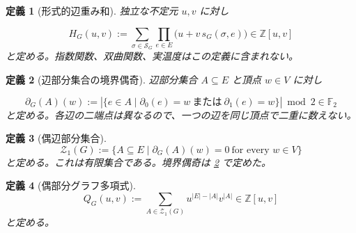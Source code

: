 \documentclass[11pt,a4paper]{article}
\newtheorem{definition}{定義}[section]
\theoremstyle{remark}
\begin{document}
\begin{definition}[形式的辺重み和]\label{lab:def_formal_edge_weight_sum}
独立な不定元 
$u,v$
 に対し

\[H_G(u,v):=\sum_{\sigma\in\mathcal S_G}\prod_{e\in E}\bigl(u+v\,s_G(\sigma,e)\bigr)\in\mathbb Z[u,v]\]
と定める。指数関数、双曲関数、実温度はこの定義に含まれない。

\end{definition}

\begin{definition}[辺部分集合の境界偶奇]\label{lab:def_mod_two_boundary_parity}
辺部分集合 
$A\subseteq E$
 と頂点 
$w\in V$
 に対し

\[\partial_G(A)(w):=\left|\{e\in A\mid \partial_0(e)=w\ \text{または}\ \partial_1(e)=w\}\right|\bmod 2\in\mathbb F_2\]
と定める。各辺の二端点は異なるので、一つの辺を同じ頂点で二重に数えない。

\end{definition}

\begin{definition}[偶辺部分集合]\label{lab:def_even_edge_subset}
\[\mathcal Z_1(G):=\{A\subseteq E\mid \partial_G(A)(w)=0\ \text{for every }w\in V\}\]
と定める。これは有限集合である。境界偶奇は 
\cref{lab:def_mod_two_boundary_parity}
 で定めた。

\end{definition}

\begin{definition}[偶部分グラフ多項式]\label{lab:def_even_subgraph_polynomial}
\[Q_G(u,v):=\sum_{A\in\mathcal Z_1(G)}u^{|E|-|A|}v^{|A|}\in\mathbb Z[u,v]\]
と定める。

\end{definition}
\end{document}
